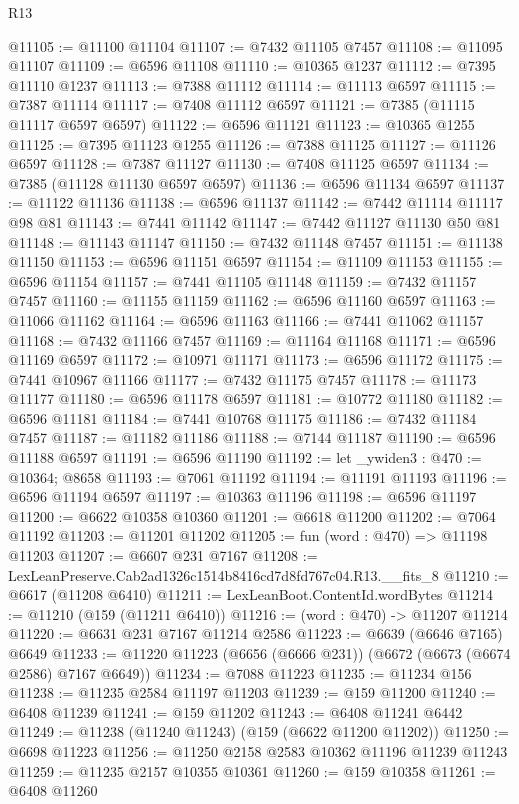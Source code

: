 \begin{lexlean}{R13}
\begin{coremodule}
@11105 := @11100 @11104
@11107 := @7432 @11105 @7457
@11108 := @11095 @11107
@11109 := @6596 @11108
@11110 := @10365 @1237
@11112 := @7395 @11110 @1237
@11113 := @7388 @11112
@11114 := @11113 @6597
@11115 := @7387 @11114
@11117 := @7408 @11112 @6597
@11121 := @7385 (@11115 @11117 @6597 @6597)
@11122 := @6596 @11121
@11123 := @10365 @1255
@11125 := @7395 @11123 @1255
@11126 := @7388 @11125
@11127 := @11126 @6597
@11128 := @7387 @11127
@11130 := @7408 @11125 @6597
@11134 := @7385 (@11128 @11130 @6597 @6597)
@11136 := @6596 @11134 @6597
@11137 := @11122 @11136
@11138 := @6596 @11137
@11142 := @7442 @11114 @11117 @98 @81
@11143 := @7441 @11142
@11147 := @7442 @11127 @11130 @50 @81
@11148 := @11143 @11147
@11150 := @7432 @11148 @7457
@11151 := @11138 @11150
@11153 := @6596 @11151 @6597
@11154 := @11109 @11153
@11155 := @6596 @11154
@11157 := @7441 @11105 @11148
@11159 := @7432 @11157 @7457
@11160 := @11155 @11159
@11162 := @6596 @11160 @6597
@11163 := @11066 @11162
@11164 := @6596 @11163
@11166 := @7441 @11062 @11157
@11168 := @7432 @11166 @7457
@11169 := @11164 @11168
@11171 := @6596 @11169 @6597
@11172 := @10971 @11171
@11173 := @6596 @11172
@11175 := @7441 @10967 @11166
@11177 := @7432 @11175 @7457
@11178 := @11173 @11177
@11180 := @6596 @11178 @6597
@11181 := @10772 @11180
@11182 := @6596 @11181
@11184 := @7441 @10768 @11175
@11186 := @7432 @11184 @7457
@11187 := @11182 @11186
@11188 := @7144 @11187
@11190 := @6596 @11188 @6597
@11191 := @6596 @11190
@11192 := let _ywiden3 : @470 := @10364; @8658
@11193 := @7061 @11192
@11194 := @11191 @11193
@11196 := @6596 @11194 @6597
@11197 := @10363 @11196
@11198 := @6596 @11197
@11200 := @6622 @10358 @10360
@11201 := @6618 @11200
@11202 := @7064 @11192
@11203 := @11201 @11202
@11205 := fun (word : @470) => @11198 @11203
@11207 := @6607 @231 @7167
@11208 := LexLeanPreserve.Cab2ad1326c1514b8416cd7d8fd767c04.R13.__fits_8
@11210 := @6617 (@11208 @6410)
@11211 := LexLeanBoot.ContentId.wordBytes
@11214 := @11210 (@159 (@11211 @6410))
@11216 := (word : @470) -> @11207 @11214
@11220 := @6631 @231 @7167 @11214 @2586
@11223 := @6639 (@6646 @7165) @6649
@11233 := @11220 @11223 (@6656 (@6666 @231)) (@6672 (@6673 (@6674 @2586) @7167 @6649))
@11234 := @7088 @11223
@11235 := @11234 @156
@11238 := @11235 @2584 @11197 @11203
@11239 := @159 @11200
@11240 := @6408 @11239
@11241 := @159 @11202
@11243 := @6408 @11241 @6442
@11249 := @11238 (@11240 @11243) (@159 (@6622 @11200 @11202))
@11250 := @6698 @11223
@11256 := @11250 @2158 @2583 @10362 @11196 @11239 @11243
@11259 := @11235 @2157 @10355 @10361
@11260 := @159 @10358
@11261 := @6408 @11260

\end{coremodule}
\end{lexlean}
